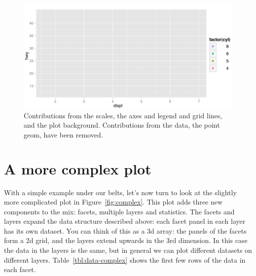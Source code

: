 \begin{figure}[htbp]
  \centering
  \includegraphics[width=0.8\linewidth]{empty}
  \caption{Contributions from the scales, the axes and legend and grid lines, and the plot background.  Contributions from the data, the point geom, have been removed.}
  \label{fig:empty}
\end{figure}

\section{A more complex plot}
\label{sec:complex-plot} 

With a simple example under our belts, let's now turn to look at the slightly more complicated plot in Figure~\ref{fig:complex}. This plot adds three new components to the mix: facets, multiple layers and statistics. The facets and layers expand the data structure described above: each facet panel in each layer has its own dataset. You can think of this as a 3d array: the panels of the facets form a 2d grid, and the layers extend upwards in the 3rd dimension. In this case the data in the layers is the same, but in general we can plot different datasets on different layers. Table~\ref{tbl:data-complex} shows the first few rows of the data in each facet.

% 



